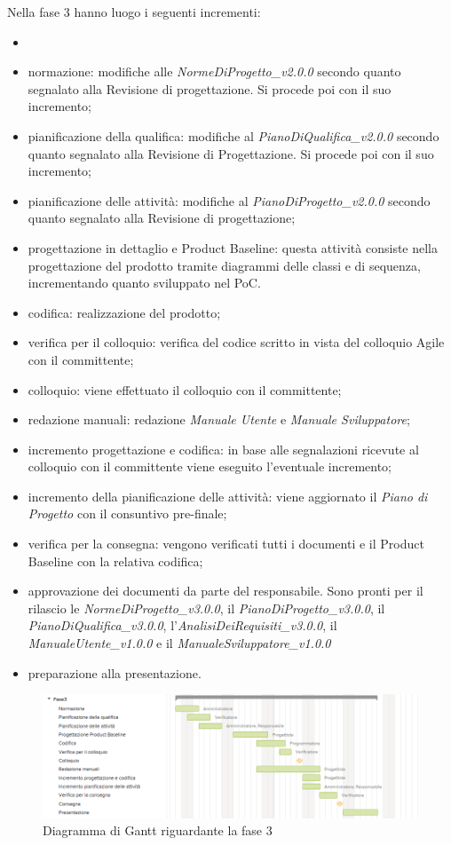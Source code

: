 Nella fase 3 hanno luogo i seguenti incrementi:
\begin{itemize}
	\item 
	
	
	
	
	\item normazione: modifiche alle \textit{NormeDiProgetto\_v2.0.0} secondo quanto segnalato alla Revisione di progettazione. Si procede poi con il suo incremento;
	\item pianificazione della qualifica: modifiche al \textit{PianoDiQualifica\_v2.0.0} secondo quanto segnalato alla Revisione di Progettazione. Si procede poi con il suo incremento;
	\item pianificazione delle attività: modifiche al \textit{PianoDiProgetto\_v2.0.0} secondo quanto segnalato alla Revisione di progettazione;
	\item progettazione in dettaglio e Product Baseline: questa attività consiste nella progettazione del prodotto tramite diagrammi delle classi e di sequenza, incrementando quanto sviluppato nel PoC.
	\item codifica: realizzazione del prodotto;
	\item verifica per il colloquio: verifica del codice scritto in vista del colloquio Agile con il committente;
	\item colloquio: viene effettuato il colloquio con il committente;
	\item redazione manuali: redazione \textit{Manuale Utente} e \textit{Manuale Sviluppatore};
	\item incremento progettazione e codifica: in base alle segnalazioni ricevute al colloquio con il committente viene eseguito l'eventuale incremento;
	\item incremento della pianificazione delle attività: viene aggiornato il \textit{Piano di Progetto} con il consuntivo pre-finale;
	\item verifica per la consegna: vengono verificati tutti i documenti e il Product Baseline con la relativa codifica;
	\item approvazione dei documenti da parte del responsabile. Sono pronti per il rilascio le \textit{NormeDiProgetto\_v3.0.0}, il \textit{PianoDiProgetto\_v3.0.0}, il \textit{PianoDiQualifica\_v3.0.0}, l'\textit{AnalisiDeiRequisiti\_v3.0.0}, il
	\textit{ManualeUtente\_v1.0.0} e il \textit{ManualeSviluppatore\_v1.0.0}
	\item preparazione alla presentazione.
\end{itemize}

\begin{figure}[h]
	\centering
	\includegraphics[scale=0.70]{images/fase3.png}
	\caption{Diagramma di Gantt riguardante la fase 3}
\end{figure}